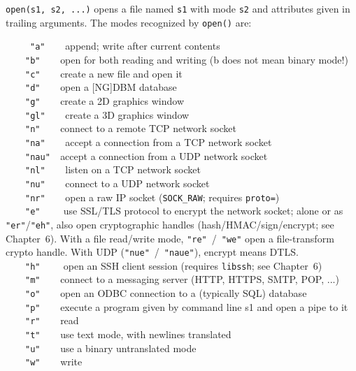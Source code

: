 \noindent
{}\texttt{open(s1, s2, ...)} opens a file named
\texttt{s1} with mode \texttt{s2} and attributes given in trailing
arguments. The modes recognized by \texttt{open()} are: 

\ \ \ \ \ \texttt{"a"\ \ \ \ }append; write
after current contents\\
 \ \ \ \ \texttt{"b"\ \ \ \ }open for both
reading and writing (b does not mean binary mode!)\\
 \ \ \ \ \texttt{"c"\ \ \ \ }create a new
file and open it\\
 \ \ \ \ \texttt{"d"\ \ \ \ }open a
[NG]DBM database\\
 \ \ \ \ \texttt{"g"\ \ \ \ }create a 2D
graphics window\\
 \ \ \ \ \texttt{"gl"\ \ \ \ }create a 3D
graphics window\\
 \ \ \ \ \texttt{"n"\ \ \ \ }connect to a
remote TCP network socket\\
 \ \ \ \ \texttt{"na"\ \ \ \ }accept a
connection from a TCP network socket \\
 \ \ \ \ \texttt{"nau"\ \ }accept a
connection from a UDP network socket\\
 \ \ \ \ \texttt{"nl"\ \ \ \ }listen on a
TCP network socket \\
 \ \ \ \ \texttt{"nu"\ \ \ \ }connect to a
UDP network socket\\
 \ \ \ \ \texttt{"nr"\ \ \ \ }open a raw
IP socket (\texttt{SOCK\_RAW}; requires \texttt{proto=})\\
 \ \ \ \ \texttt{"e"\ \ \ \ } use SSL/TLS protocol to
encrypt the network socket; alone or as
\texttt{"er"}/\texttt{"eh"}, also open cryptographic
handles (hash/HMAC/sign/encrypt; see Chapter~6).
With a file read/write mode, \texttt{"re"}~/~\texttt{"we"} open a
file-transform crypto handle. With UDP
(\texttt{"nue"}~/~\texttt{"naue"}), encrypt means DTLS.\\
 \ \ \ \ \texttt{"h"\ \ \ \ } open an SSH client
session (requires \texttt{libssh}; see Chapter~6)\\
 \ \ \ \ \texttt{"m"\ \ \ \ }connect to a
messaging server (HTTP, HTTPS, SMTP, POP, ...)\\
 \ \ \ \ \texttt{"o"\ \ \ \ }open an
ODBC connection to a (typically SQL)
database\\
 \ \ \ \ \texttt{"p"\ \ \ \ }execute a
program given by command line s1 and open a pipe to it\\
 \ \ \ \ \texttt{"r"\ \ \ \ }read\\
 \ \ \ \ \texttt{"t"\ \ \ \ }use text mode,
with newlines translated\\
 \ \ \ \ \texttt{"u"\ \ \ \ }use a binary
untranslated mode\\
 \ \ \ \ \texttt{"w"\ \ \ \ }write

